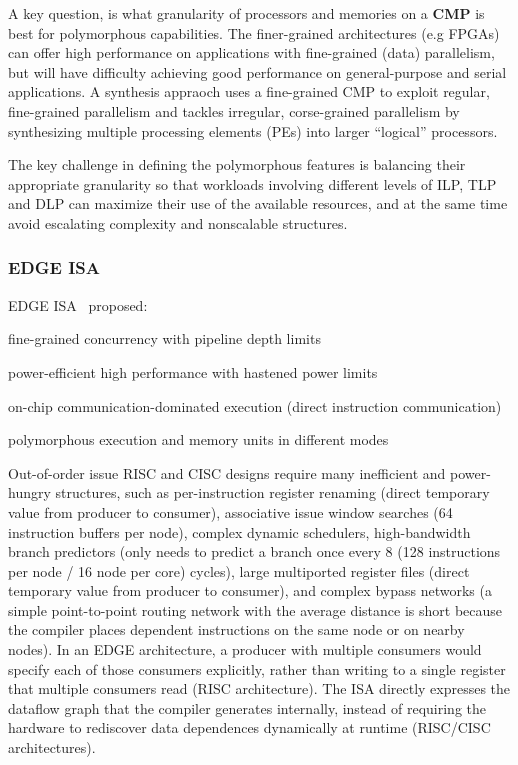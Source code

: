 \documentclass[UTF8,12pt,a4paper]{article}
\begin{document}
A key question, is what granularity of processors and memories
on a \textbf{CMP} is best for polymorphous capabilities.
The finer-grained architectures (e.g FPGAs) can offer high performance
on applications with fine-grained (data) parallelism,
but will have difficulty achieving good performance on general-purpose and serial applications.
A synthesis appraoch uses a fine-grained CMP to exploit regular, fine-grained parallelism
and tackles irregular, corse-grained parallelism by
synthesizing multiple processing elements (PEs) into larger ``logical'' processors.

The key challenge in defining the polymorphous features
is balancing their appropriate granularity so that
workloads involving different levels of ILP, TLP and DLP
can maximize their use of the available resources,
and at the same time avoid escalating complexity and nonscalable structures.

\subsubsection{EDGE ISA}

EDGE ISA~\cite{DBLP:journals/computer/BurgerKMDJLMBMY04} proposed:

\begin{compactitem}
  \item fine-grained concurrency with pipeline depth limits
  \item power-efficient high performance with hastened power limits
  \item on-chip communication-dominated execution (direct instruction communication)
  \item polymorphous execution and memory units in different modes
\end{compactitem}

Out-of-order issue RISC and CISC designs require many inefficient and power-hungry structures,
such as per-instruction register renaming (direct temporary value from producer to consumer),
associative issue window searches (64 instruction buffers per node),
complex dynamic schedulers,
high-bandwidth branch predictors (only needs to predict a branch once every 8 (128 instructions per node / 16 node per core) cycles),
large multiported register files (direct temporary value from producer to consumer),
and complex bypass networks (a simple point-to-point routing network with the average distance is short
because the compiler places dependent instructions on the same node or on nearby nodes).
In an EDGE architecture, a producer with multiple consumers would specify each of those consumers explicitly,
rather than writing to a single register that multiple consumers read (RISC architecture).
The ISA directly expresses the dataflow graph that the compiler generates internally,
instead of requiring the hardware to rediscover data dependences dynamically at runtime (RISC/CISC architectures).
\end{document}
